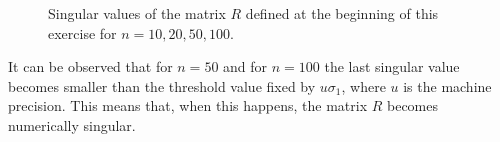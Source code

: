 \documentclass[a4paper,11pt]{article}
\begin{document}
\begin{figure}[H]
	 \qquad
	
	\caption{Singular values of the matrix $R$ defined at the beginning of this exercise for $n=10,20,50,100$.}
	\label{fig:Singular_values_of_R_for_different_dimensions}
\end{figure}

\noindent It can be observed that for $n=50$ and for $n=100$ the last singular value becomes smaller than the threshold value fixed by $u\sigma_{1}$, where $u$ is the machine precision. This means that, when this happens, the matrix $R$ becomes numerically singular.
\end{document}
